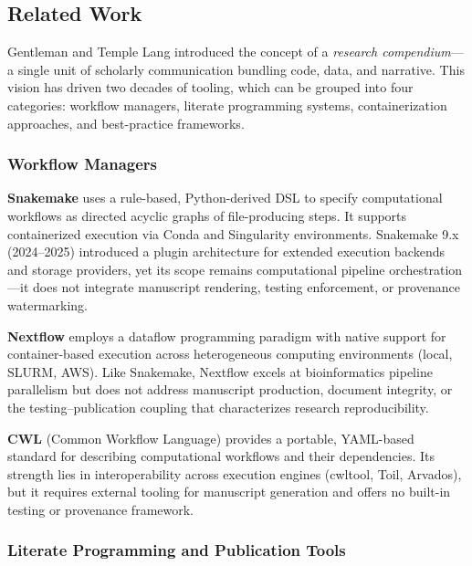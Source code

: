 \documentclass[
]{article}
\begin{document}
\subsection{Related Work}\label{related-work}

Gentleman and Temple Lang \citep{gentleman2007research} introduced the
concept of a \emph{research compendium}---a single unit of scholarly
communication bundling code, data, and narrative. This vision has driven
two decades of tooling, which can be grouped into four categories:
workflow managers, literate programming systems, containerization
approaches, and best-practice frameworks.

\subsubsection{Workflow Managers}\label{workflow-managers}

\textbf{Snakemake} \citep{koster2012snakemake} uses a rule-based,
Python-derived DSL to specify computational workflows as directed
acyclic graphs of file-producing steps. It supports containerized
execution via Conda and Singularity environments. Snakemake 9.x
(2024--2025) introduced a plugin architecture for extended execution
backends and storage providers, yet its scope remains computational
pipeline orchestration---it does not integrate manuscript rendering,
testing enforcement, or provenance watermarking.

\textbf{Nextflow} \citep{ditommaso2017nextflow} employs a dataflow
programming paradigm with native support for container-based execution
across heterogeneous computing environments (local, SLURM, AWS). Like
Snakemake, Nextflow excels at bioinformatics pipeline parallelism but
does not address manuscript production, document integrity, or the
testing--publication coupling that characterizes research
reproducibility.

\textbf{CWL} (Common Workflow Language) \citep{amstutz2016cwl} provides
a portable, YAML-based standard for describing computational workflows
and their dependencies. Its strength lies in interoperability across
execution engines (cwltool, Toil, Arvados), but it requires external
tooling for manuscript generation and offers no built-in testing or
provenance framework.

\subsubsection{Literate Programming and Publication
Tools}\label{literate-programming-and-publication-tools}
\end{document}

